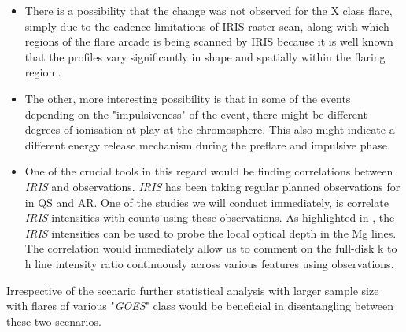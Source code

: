     \begin{itemize}[label=]
        \item There is a possibility that the change was not observed for the X class flare, simply due to the cadence limitations of IRIS raster scan, along with which regions of the flare arcade is being scanned by IRIS because it is well known that the  profiles vary significantly in shape and spatially within the flaring region \citep{panos18,dalda23}.
        \item The other, more interesting possibility is that in some of the events depending on the "impulsiveness" of the event, there might be different degrees of ionisation at play at the chromosphere. This also might indicate a different energy release mechanism during the preflare and impulsive phase.
        \item One of the crucial tools in this regard would be finding correlations between {\it IRIS} and {\suit} observations. {\it IRIS} has been taking regular planned observations for {\suit} in QS and AR. One of the studies we will conduct immediately, is correlate {\it IRIS} intensities with {\suit} counts using these observations. As highlighted in \cite{roy24}, the {\it IRIS} intensities can be used to probe the local optical depth in the Mg lines. The correlation would immediately allow us to comment on the full-disk  k to h line intensity ratio continuously across various features using {\suit} observations.
    \end{itemize}

Irrespective of the scenario further statistical analysis with larger sample size with flares of various "{\it GOES}" class would be beneficial in disentangling between these two scenarios.

